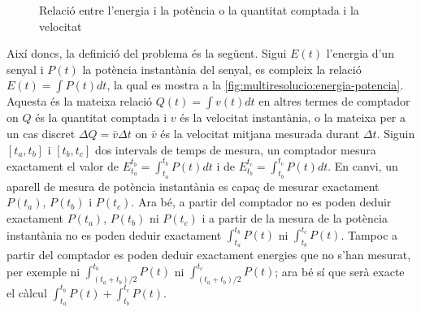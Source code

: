  



\begin{figure}[tp]
  \centering


      \caption{Relació entre l'energia i la potència o la quantitat
        comptada i la velocitat}
  \label{fig:multiresolucio:energia-potencia}
\end{figure}




Així doncs, la definició del problema és la següent.  Sigui $E(t)$
l'energia d'un senyal i $P(t)$ la potència instantània del senyal, es
compleix la relació $E(t)=\int P(t) dt$, la qual es mostra a la
\autoref{fig:multiresolucio:energia-potencia}. Aquesta és la mateixa
relació $Q(t)=\int v(t) dt$ en altres termes de comptador on $Q$ és la
quantitat comptada i $v$ és la velocitat instantània, o la mateixa per
a un cas discret $\Delta Q = \bar{v} \Delta t$ on $\bar{v}$ és la
velocitat mitjana mesurada durant $\Delta t$. %
Siguin $[t_a,t_b]$ i $[t_b,t_c]$ dos intervals de temps de mesura, un
comptador mesura exactament el valor de $E_{t_a}^{t_b} =
\int_{t_a}^{t_b} P(t) dt$ i de $E_{t_b}^{t_c} =\int_{t_b}^{t_c} P(t) dt$. En canvi,
un aparell de mesura de potència instantània es capaç de mesurar
exactament $P(t_a)$, $P(t_b)$ i $P(t_c)$. Ara bé, a partir del
comptador no es poden deduir exactament $P(t_a)$, $P(t_b)$ ni $P(t_c)$
i a partir de la mesura de la potència instantània no es poden deduir
exactament $\int_{t_a}^{t_b} P(t)$ ni $\int_{t_b}^{t_c} P(t)$. Tampoc
a partir del comptador es poden deduir exactament energies que no
s'han mesurat, per exemple ni $\int_{(t_a+t_b)/2}^{t_b} P(t)$ ni
$\int_{(t_a+t_b)/2}^{t_c} P(t)$; ara bé sí que serà exacte el càlcul
$\int_{t_a}^{t_b} P(t)+\int_{t_b}^{t_c} P(t)$.
  

